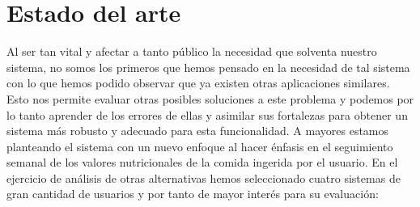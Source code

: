 \documentclass[12pt, a4paper, twoside]{book}
\begin{document}
	\chapter{Estado del arte}
	Al ser tan vital y afectar a tanto público la necesidad que solventa nuestro sistema, no somos los primeros que hemos pensado en la necesidad de tal sistema con lo que hemos podido observar que ya existen otras aplicaciones similares.
	Esto nos permite evaluar otras posibles soluciones a este problema y podemos por lo tanto aprender de los errores de ellas y asimilar sus fortalezas para obtener un sistema más robusto y adecuado para esta funcionalidad. A mayores estamos planteando el sistema con un nuevo enfoque al hacer énfasis en el seguimiento semanal de los valores nutricionales de la comida ingerida por el usuario.
	En el ejercicio de análisis de otras alternativas hemos seleccionado cuatro sistemas de gran cantidad de usuarios y por tanto de mayor interés para su evaluación:
\end{document}
